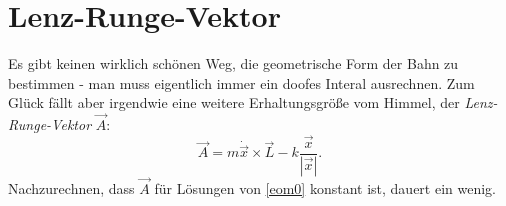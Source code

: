 \section{Lenz-Runge-Vektor}
Es gibt keinen wirklich schönen Weg, die geometrische Form der Bahn zu bestimmen - man muss eigentlich immer ein doofes Interal ausrechnen. Zum Glück fällt aber irgendwie eine weitere Erhaltungsgröße vom Himmel, der \emph{Lenz-Runge-Vektor} $\vec{A}$:
\[
  \vec{A} = m\dot{\vec{x}}\times \vec{L} - k\frac{\vec{x}}{|\vec{x}|}.
\]
Nachzurechnen, dass $\vec{A}$ für Lösungen von \eqref{eom0} konstant ist, dauert ein wenig.
